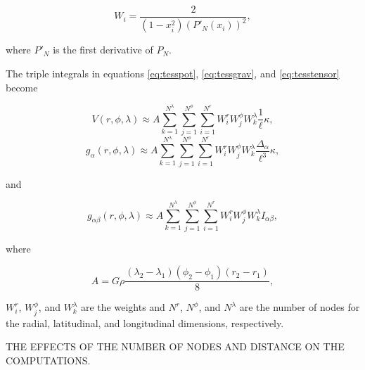 \documentclass[extra]{gji}
\begin{document}
\begin{equation}
    W_i = \frac{2}{(1 - x_i^2)(P'_N(x_i))^2},
\end{equation}

\noindent
where $P'_N$ is the first derivative of $P_N$.

The triple integrals in equations
\ref{eq:tesspot},
\ref{eq:tessgrav},
and
\ref{eq:tesstensor}
become

\begin{equation}
    V(r,\phi,\lambda) \approx
        A
        \sum\limits_{k=1}^{N^{\lambda}}
        \sum\limits_{j=1}^{N^{\phi}}
        \sum\limits_{i=1}^{N^r}
        W^r_i W^{\phi}_j W^{\lambda}_k
        \frac{1}{\ell} \kappa,
\end{equation}
\begin{equation}
    g_{\alpha}(r,\phi,\lambda) \approx
        A
        \sum\limits_{k=1}^{N^{\lambda}}
        \sum\limits_{j=1}^{N^{\phi}}
        \sum\limits_{i=1}^{N^r}
        W^r_i W^{\phi}_j W^{\lambda}_k
        \frac{\Delta_{\alpha}}{\ell^3} \kappa,
\end{equation}

\noindent
and

\begin{equation}
    g_{\alpha\beta}(r,\phi,\lambda) \approx
        A
        \sum\limits_{k=1}^{N^{\lambda}}
        \sum\limits_{j=1}^{N^{\phi}}
        \sum\limits_{i=1}^{N^r}
        W^r_i W^{\phi}_j W^{\lambda}_k
        I_{\alpha\beta},
\end{equation}

\noindent
where

\begin{equation}
    A = G \rho
    \frac{(\lambda_2 - \lambda_1)(\phi_2 - \phi_1)(r_2 - r_1)}{8},
\end{equation}

\noindent
$W_i^r$, $W_j^{\phi}$, and $W_k^{\lambda}$
are the weights
and $N^r$, $N^{\phi}$, and $N^{\lambda}$
are the number of nodes
for the radial, latitudinal, and longitudinal dimensions, respectively.

THE EFFECTS OF THE NUMBER OF NODES AND DISTANCE ON THE COMPUTATIONS.
\end{document}
